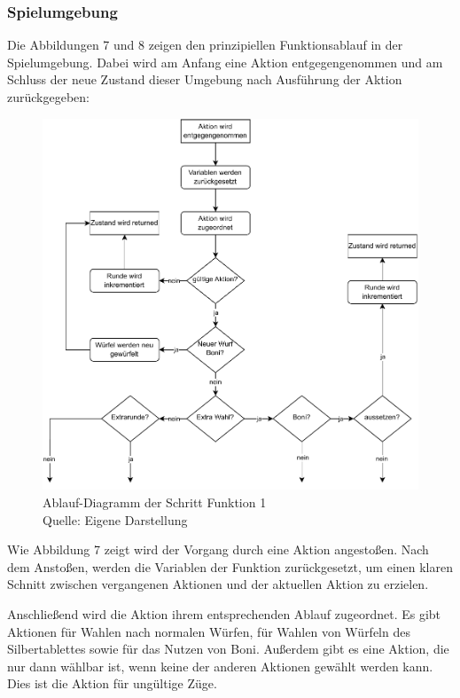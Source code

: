 \subsubsection{Spielumgebung}
Die Abbildungen 7 und 8 zeigen den prinzipiellen Funktionsablauf in der Spielumgebung. Dabei wird am Anfang eine Aktion entgegengenommen und am Schluss der neue Zustand dieser Umgebung nach Ausführung der Aktion zurückgegeben:
\nopagebreak
\begin{figure}[H]
	\includegraphics[width=1\textwidth]{Bilder/step3.drawio} 
	\caption[Ablauf-Diagramm der Schritt-Funktion 1]{Ablauf-Diagramm der Schritt Funktion 1\\ Quelle: Eigene Darstellung}
\end{figure}	

Wie Abbildung 7 zeigt wird der Vorgang durch eine Aktion angestoßen. Nach dem Anstoßen, werden die Variablen der Funktion zurückgesetzt, um einen klaren Schnitt zwischen vergangenen Aktionen und der aktuellen Aktion zu erzielen.

Anschließend wird die Aktion ihrem entsprechenden Ablauf zugeordnet. Es gibt Aktionen für Wahlen nach normalen Würfen, für Wahlen von Würfeln des Silbertablettes sowie für das Nutzen von Boni. Außerdem gibt es eine Aktion, die nur dann wählbar ist, wenn keine der anderen Aktionen gewählt werden kann. Dies ist die Aktion für ungültige Züge.

